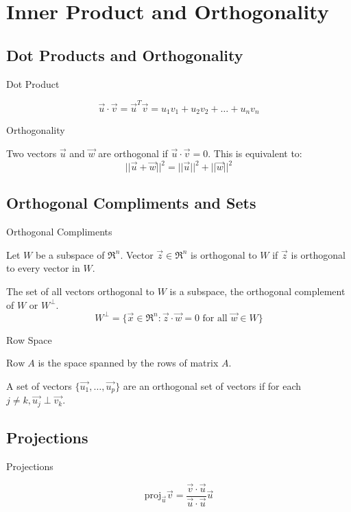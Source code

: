 \section{Inner Product and Orthogonality}
\subsection{Dot Products and Orthogonality}
\begin{definition} Dot Product

    \[\Vec{u}\cdot \Vec{v} = \Vec{u}^T\Vec{v} = u_1 v_1 + u_2 v_2 + \dots + u_n v_n\]    
\end{definition}
\begin{definition} Orthogonality

    Two vectors \(\Vec{u}\) and \(\Vec{w}\) are orthogonal if \(\Vec{u} \cdot \Vec{v} = 0\). This is equivalent to:
    \[||\Vec{u}+\Vec{w}||^2=||\Vec{u}||^2+||\Vec{w}||^2\]
\end{definition}

\subsection{Orthogonal Compliments and Sets}
\begin{definition} Orthogonal Compliments

    Let \(W\) be a subspace of \(\Re^n\). Vector \(\Vec{z} \in \Re^n\) is orthogonal to \(W\) if \(\Vec{z}\) is orthogonal to every vector in \(W\).

    The set of all vectors orthogonal to \(W\) is a subspace, the orthogonal complement of \(W\) or \(W^\perp\).
    \[W^\perp = \{\Vec{x} \in \Re^n : \Vec{z} \cdot \Vec{w} = 0 \text{ for all } \Vec{w} \in W\}\]
\end{definition}
\begin{definition} Row Space

    \(\text{Row} \; A\) is the space spanned by the rows of matrix \(A\).
\end{definition}

\begin{definition}
    A set of vectors \(\{\Vec{u_1}, \dots, \Vec{u_p}\}\) are an orthogonal set of vectors if for each \(j\ne k, \Vec{u_j}\perp \Vec{v_k}\).
\end{definition}

\subsection{Projections}
\begin{definition} Projections

    \[\text{proj}_{\Vec{u}} \Vec{v} = \frac{\Vec{v} \cdot \Vec{u}}{\Vec{u} \cdot \Vec{u}}\Vec{u}\]
\end{definition}

